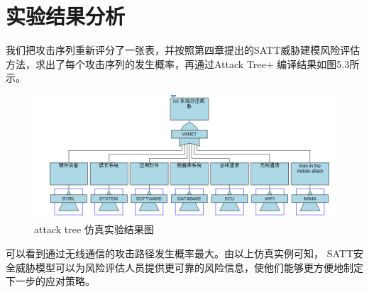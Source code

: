 \section{实验结果分析}
我们把攻击序列重新评分了一张表，并按照第四章提出的SATT威胁建模风险评估方法，求出了每个攻击序列的发生概率，再通过Attack Tree+ 编译结果如图5.3所示。
\begin{figure}
  \centering
  \includegraphics[scale=0.5]{resources/img/c52.jpg}
  \caption{attack tree 仿真实验结果图}
\end{figure}
可以看到通过无线通信的攻击路径发生概率最大。由以上仿真实例可知，
SATT安全威胁模型可以为风险评估人员提供更可靠的风险信息，使他们能够更方便地制定下一步的应对策略。
